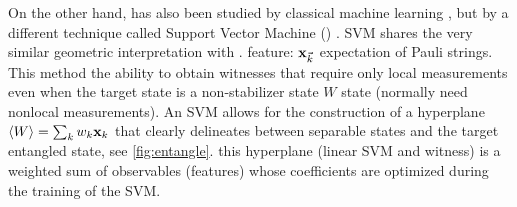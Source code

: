 \documentclass[
reprint,
aps,
pra,
floatfix,
]{revtex4-2}
\theoremstyle{plain}
\theoremstyle{definition}
\newtheorem{remark}{Remark}
\newcommand{\ew}{W}
\begin{document}

On the other hand,  has also been studied by classical machine learning \cite{zhuMachineLearningDerivedEntanglement2021}  \cite{vintskevichClassificationFourqubitEntangled2022}, 
but by a different technique called Support Vector Machine ()  \cite{cortesSupportvectorNetworks1995}.
SVM shares the very similar geometric interpretation with .
feature: $\vb{x}_{\vec{k}}$ expectation of Pauli strings.
This method the ability to obtain witnesses that require only local measurements even when the target state is a non-stabilizer state $W$ state (normally need nonlocal measurements).
An SVM allows for the construction of a hyperplane $\expval{\ew}=\sum_k w_k \vbx_{k}$ that clearly delineates between separable states and the target entangled state, see \cref{fig:entangle}.
this hyperplane (linear SVM and witness) is a weighted sum of observables (features) whose coefficients are optimized during the training of the SVM.
\end{document}

